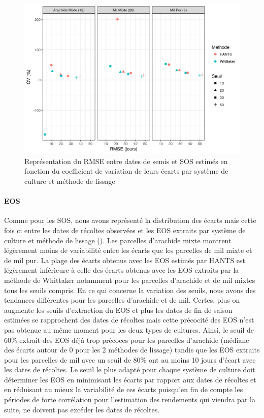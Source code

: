 \begin{figure}[htbp]
 \begin{center}
  \includegraphics[scale=0.7]{resultats_discussions/SOS_RMSE_vs_CV.png} 
 \end{center}
 \caption[SOS -- RMSE vs CV]{Représentation du RMSE entre dates de semis et SOS estimés en fonction du coefficient de variation de leurs écarts par système de culture et méthode de lissage}
 \label{fig-sos-rmse-cv}
\end{figure}

\newpage

\paragraph{EOS}
Comme pour les SOS, nous avons représenté la distribution des écarts mais cette fois ci entre les dates de récoltes observées et les EOS extraits par système de culture et méthode de lissage (). Les parcelles d’arachide mixte montrent légèrement moins de variabilité entre les écarts que les parcelles de mil mixte et de
mil pur. La plage des écarts obtenus avec les EOS estimés par HANTS est légèrement inférieure à celle des écarts obtenus avec les EOS extraits par la méthode de Whittaker notamment pour les parcelles d’arachide et de mil mixtes tous les seuils compris. En ce qui concerne la variation des seuils, nous avons des tendances différentes pour les parcelles d’arachide et de mil. Certes, plus on augmente les seuils d’extraction du EOS et plus les dates de fin de saison estimées se rapprochent des dates de récoltes mais cette précocité des EOS n’est pas obtenue au même moment pour les deux types de cultures. Ainsi, le seuil de 60\% extrait des EOS déjà trop précoces pour les parcelles d’arachide (médiane des écarts autour de 0 pour les 2 méthodes de lissage) tandis
que les EOS extraits pour les parcelles de mil avec un seuil de 80\% ont au moins 10 jours d’écart avec les dates de récoltes. Le seuil le plus adapté pour chaque système de culture doit déterminer les EOS en minimisant les écarts par rapport aux dates de récoltes et en réduisant au mieux la variabilité de ces écarts puisqu’en fin de compte les périodes de forte corrélation pour l’estimation des rendements qui viendra par la suite, ne doivent pas excéder les dates de récoltes.

